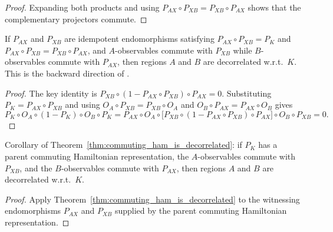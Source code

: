 \begin{proof}
    \leanok
    Expanding both products and using $P_{AX} \circ P_{XB}
        = P_{XB} \circ P_{AX}$ shows that the complementary projectors commute.
\end{proof}

\begin{theorem}%
    \label{thm:commuting_ham_is_decorrelated}
    \leanok
    If $P_{AX}$ and $P_{XB}$ are idempotent endomorphisms satisfying
    $P_{AX} \circ P_{XB} = P_K$ and
    $P_{AX} \circ P_{XB} = P_{XB} \circ P_{AX}$, and
    $A$-observables commute with $P_{XB}$ while $B$-observables commute
    with $P_{AX}$, then regions $A$ and $B$ are decorrelated w.r.t.\ $K$.
    This is the backward direction of
    \cite[Appendix~D, Section~D.2, Proposition~D.3]{Cirac2016MPDO_arXiv}.
\end{theorem}

\begin{proof}
    \leanok
    The key identity is $P_{XB} \circ (1 - P_{AX} \circ P_{XB}) \circ P_{AX} = 0$.
    Substituting $P_K = P_{AX} \circ P_{XB}$ and using
    $O_A \circ P_{XB} = P_{XB} \circ O_A$ and
    $O_B \circ P_{AX} = P_{AX} \circ O_B$ gives
    \[
        P_K \circ O_A \circ (1 - P_K) \circ O_B \circ P_K
        = P_{AX} \circ O_A \circ
          \bigl[P_{XB} \circ (1 - P_{AX} \circ P_{XB}) \circ P_{AX}\bigr]
          \circ O_B \circ P_{XB} = 0.
    \]
\end{proof}

\begin{theorem}%
    \label{thm:has_commuting_parent_ham_is_decorrelated}
    \leanok
    Corollary of Theorem~\ref{thm:commuting_ham_is_decorrelated}: if
    $P_K$ has a parent commuting Hamiltonian representation, the $A$-observables
    commute with $P_{XB}$, and the $B$-observables commute with $P_{AX}$, then
    regions $A$ and $B$ are decorrelated w.r.t.\ $K$.
\end{theorem}

\begin{proof}
    \leanok
    Apply Theorem~\ref{thm:commuting_ham_is_decorrelated} to the witnessing
    endomorphisms $P_{AX}$ and $P_{XB}$ supplied by the parent commuting
    Hamiltonian representation.
\end{proof}

